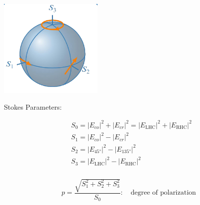 \begin{center}
\includegraphics[width=5cm]{content/at_meas/pictures/poincare_sphere}
\end{center}

Stokes Parameters:

\begin{align*}
  &S_{0} = {|E_{co}|}^{2} + {|E_{cr}|}^{2} = {|E_{\text{LHC}}|}^{2} + {|E_{\text{RHC}}|}^{2}\\
  &S_{1} = {|E_{co}|}^{2} - {|E_{cr}|}^{2}\\
  &S_{2} = {|E_{45°}|}^{2} - {|E_{135°}|}^{2}\\
  &S_{3} = {|E_{\text{LHC}}|}^{2} - {|E_{\text{RHC}}|}^{2}\\
\end{align*}

\begin{align*}
  p = \dfrac{\sqrt{S_{1}^{2} + S_{2}^{2} + S_{3}^{2}}}{S_{0}}: \quad \text{degree of polarization}
\end{align*}
